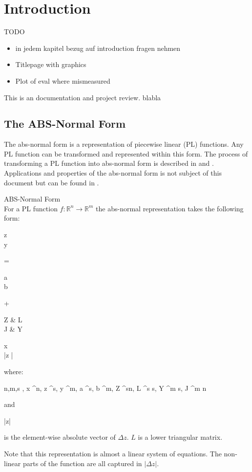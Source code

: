 \section{Introduction}
TODO
\begin{itemize}
	\item in jedem kapitel bezug auf introduction fragen nehmen
	\item Titlepage with graphics
	\item Plot of eval where mismeasured
\end{itemize}


This is an documentation and project review. blabla

\subsection{The ABS-Normal Form}
The abs-normal form is a representation of piecewise linear (PL) functions. Any PL function can be transformed and represented within this form. The process of transforming a PL function into abs-normal form is described in \cite{Griewank2013} and \cite{Griewank2017}. Applications and properties of the abs-normal form is not subject of this document but can be found in \cite{Griewank2017}.

\begin{mydef*}
	ABS-Normal Form \\
	For a PL function $f:\mathbb{R}^n \rightarrow \mathbb{R}^m$ the abs-normal representation takes the following form:
	\begin{flalign} \label{absnf}
	\begin{pmatrix}
	\Delta z \\
	\Delta y
	\end{pmatrix}
	= 
	\begin{pmatrix}
	a \\
	b
	\end{pmatrix}
	+
	\begin{pmatrix}
	Z & L \\
	J & Y 
	\end{pmatrix}
	\times
	\begin{pmatrix}
	\Delta x \\
	|\Delta z |
	\end{pmatrix}
	\end{flalign}
	where:
	\begin{flalign*}
		n,m,s \in {}, \Delta x \in {}^n, \Delta z \in {}^s, \Delta y \in {}^m, a \in {}^s, b \in {}^{m}, Z \in {}^{s\times n}, L \in {}^{s \times s}, Y \in {}^{m \times s}, J \in {}^{m \times n}
	\end{flalign*}
	and 
	\begin{flalign*}
		|\Delta z|
	\end{flalign*}
	is the element-wise absolute vector of $\Delta z$. $L$ is a lower triangular matrix.
\end{mydef*}
Note that this representation is almost a linear system of equations. The non-linear parts of the function are all captured in $|\Delta z|$.

